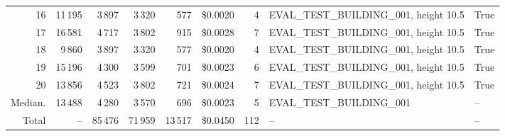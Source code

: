 \documentclass[a4paper,11pt]{article}
\begin{document}
\begin{table}[ht]
\begin{tabular}{r r r r r r r p{3cm} l}
16 & 11\,195 & 3\,897 & 3\,320 & 577 & \$0.0020 & 4 & EVAL\_TEST\_BUILDING\_001, height 10.5 & True \\
17 & 16\,581 & 4\,717 & 3\,802 & 915 & \$0.0028 & 7 & EVAL\_TEST\_BUILDING\_001, height 10.5 & True \\
18 & 9\,860 & 3\,897 & 3\,320 & 577 & \$0.0020 & 4 & EVAL\_TEST\_BUILDING\_001, height 10.5 & True \\
19 & 15\,196 & 4\,300 & 3\,599 & 701 & \$0.0023 & 6 & EVAL\_TEST\_BUILDING\_001, height 10.5 & True \\
20 & 13\,856 & 4\,523 & 3\,802 & 721 & \$0.0024 & 7 & EVAL\_TEST\_BUILDING\_001, height 10.5 & True \\
\hline
Median. & 13\,488 & 4\,280 & 3\,570 & 696 & \$0.0023 & 5 & EVAL\_TEST\_BUILDING\_001 & -- \\
Total & -- & 85\,476 & 71\,959 & 13\,517 & \$0.0450 & 112 & -- & -- \\
\hline
\end{tabular}
\end{table}

\clearpage
\end{document}
